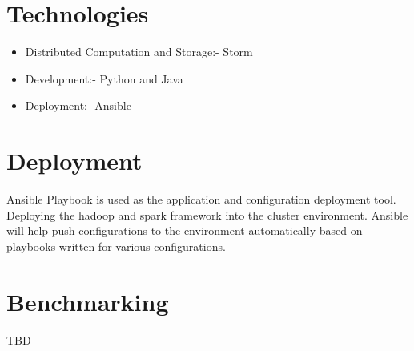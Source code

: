 \documentclass[9pt,twocolumn,twoside]{../../styles/osajnl}
\begin{document}
\section{Technologies}

\begin{itemize}
\item Distributed Computation and Storage:- Storm
\item Development:- Python and Java
\item Deployment:- Ansible
\end{itemize}

    
\section{Deployment}
Ansible Playbook is used as the application and configuration
deployment tool. Deploying the hadoop and spark framework into the
cluster environment. Ansible will help push configurations to the
environment automatically based on playbooks written for various
configurations.\cite{www-storm-apache}\cite{www-storm-zookeeper}


\section{Benchmarking}
TBD


\end{document}
